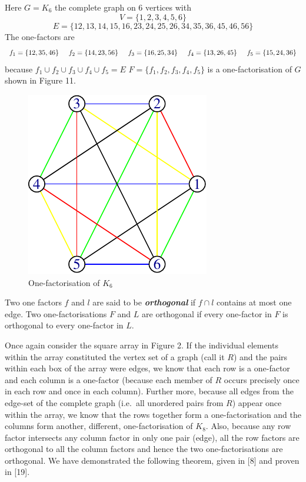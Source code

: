 \documentclass[
  12pt,
  a4paper]{book}
\begin{document}
Here \(G = K_6\) the complete graph on 6 vertices with
\[V = \{1, 2, 3, 4, 5, 6\}\]
\[E = \{12, 13, 14, 15, 16, 23, 24, 25, 26, 34, 35, 36, 45, 46, 56\}\]
The one-factors are
\[f_1 = \{12, 35, 46\} \hspace{0.5cm} f_2 = \{14, 23, 56\} \hspace{0.5cm} f_3 = \{16, 25, 34\} 
\hspace{0.5cm} f_4 = \{13, 26, 45\} \hspace{0.5cm}  f_5 = \{15, 24, 36\}\]
because \(f_1 \cup f_2 \cup f_3 \cup f_4 \cup f_5 = E\)
\(F = \{f_1, f_2, f_3, f_4, f_5\}\) is a one-factorisation of \(G\)
shown in Figure 11.

\begin{figure}
\centering
\includegraphics{figure/one-factorisation-1.pdf}
\caption{One-factorisation of \(K_6\)}
\end{figure}

Two one factors \(f\) and \(l\) are said to be
\textbf{\emph{orthogonal}} if \(f \cap l\) contains at most one edge.
Two one-factorisations \(F\) and \(L\) are orthogonal if every
one-factor in \(F\) is orthogonal to every one-factor in \(L\).

Once again consider the square array in Figure 2. If the individual
elements within the array constituted the vertex set of a graph (call it
\(R\)) and the pairs within each box of the array were edges, we know
that each row is a one-factor and each column is a one-factor (because
each member of \(R\) occurs precisely once in each row and once in each
column). Further more, because all edges from the edge-set of the
complete graph (i.e.~all unordered pairs from \(R\)) appear once within
the array, we know that the rows together form a one-factorisation and
the columns form another, different, one-factorisation of \(K_8\). Also,
because any row factor intersects any column factor in only one pair
(edge), all the row factors are orthogonal to all the column factors and
hence the two one-factorisations are orthogonal. We have demonstrated
the following theorem, given in {[}8{]} and proven in {[}19{]}.
\end{document}
